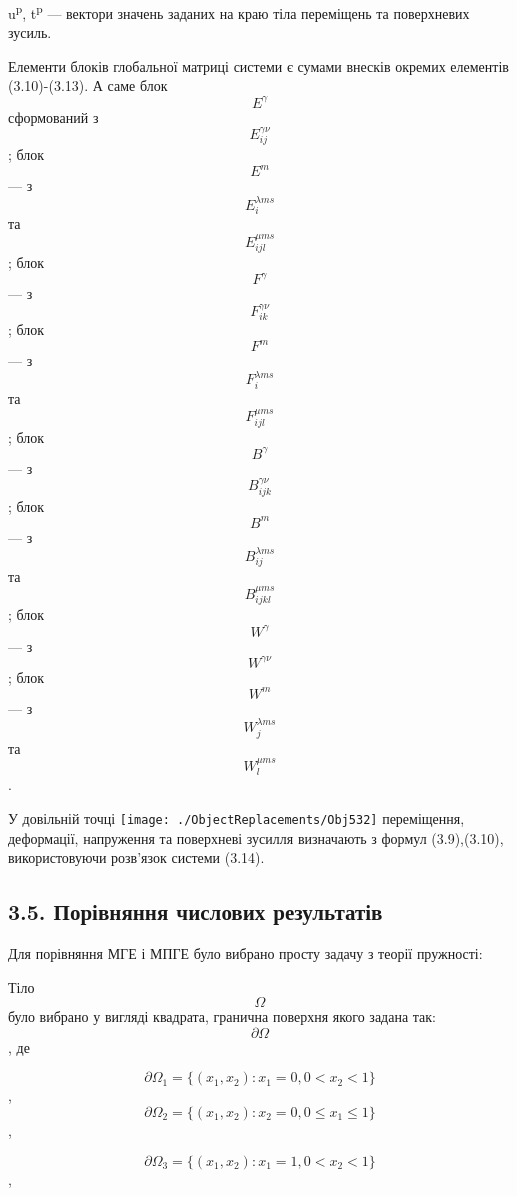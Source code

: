 u\textsuperscript{p}, t\textsuperscript{p} --- вектори значень заданих
на краю тіла переміщень та поверхневих зусиль.

Елементи блоків глобальної матриці системи є сумами внесків окремих
елементів (3.10)-(3.13). А саме блок \[E^{\gamma}{}\] сформований з
\[E_{\mathit{\text{ij}}}^{\mathit{\text{γν}}}{}\]; блок \[E^{m}{}\] ---
з \[E_{i}^{\lambda\mathit{\text{ms}}}{}\] та
\[E_{\mathit{\text{ijl}}}^{\mu\mathit{\text{ms}}}{}\]; блок
\[F^{\gamma}{}\] --- з
\[F_{\mathit{\text{ik}}}^{\mathit{\text{γν}}}{}\]; блок \[F^{m}{}\] ---
з \[F_{i}^{\lambda\mathit{\text{ms}}}{}\] та
\[F_{\mathit{\text{ijl}}}^{\mu\mathit{\text{ms}}}{}\]; блок
\[B^{\gamma}{}\]--- з
\[B_{\mathit{\text{ijk}}}^{\mathit{\text{γν}}}{}\]; блок \[B^{m}{}\] ---
з \[B_{\mathit{\text{ij}}}^{\lambda\mathit{\text{ms}}}{}\] та
\[B_{\mathit{\text{ijkl}}}^{\mu\mathit{\text{ms}}}{}\]; блок
\[W^{\gamma}{}\]--- з \[W^{\mathit{\text{γν}}}{}\]; блок \[W^{m}{}\] ---
з \[W_{j}^{\lambda\mathit{\text{ms}}}{}\] та
\[W_{l}^{\mu\mathit{\text{ms}}}{}\].

У довільній точці
\texttt{[image: ./ObjectReplacements/Obj532]}
переміщення, деформації, напруження та поверх­неві зусилля визначають з
формул (3.9),(3.10), використовуючи розв'язок системи (3.14).

\hypertarget{ux43fux43eux440ux456ux432ux43dux44fux43dux43dux44f-ux447ux438ux441ux43bux43eux432ux438ux445-ux440ux435ux437ux443ux43bux44cux442ux430ux442ux456ux432}{%
\subsection[3.5. Порівняння числових
результатів]{\texorpdfstring{\protect\hypertarget{anchor-51}{}{}3.5.
Порівняння числових
результатів}{3.5. Порівняння числових результатів}}\label{ux43fux43eux440ux456ux432ux43dux44fux43dux43dux44f-ux447ux438ux441ux43bux43eux432ux438ux445-ux440ux435ux437ux443ux43bux44cux442ux430ux442ux456ux432}}

Для порівняння МГЕ і МПГЕ було вибрано просту задачу з теорії пружності:

Тіло \[\Omega{}\] було вибрано у вигляді квадрата, гранична поверхня
якого задана так: \[{\partial\Omega}{}\], де

\[{\partial{\Omega_{1} = {\{{(x_{1},x_{2}):{x_{1} = 0,0 < x_{2} < 1}}\}}}}{}\],
\[{\partial{\Omega_{2} = {\{{(x_{1},x_{2}):{x_{2} = 0,0 \leq x_{1} \leq 1}}\}}}}{}\],

\[{\partial{\Omega_{3} = {\{{(x_{1},x_{2}):{x_{1} = 1,0 < x_{2} < 1}}\}}}}{}\],

